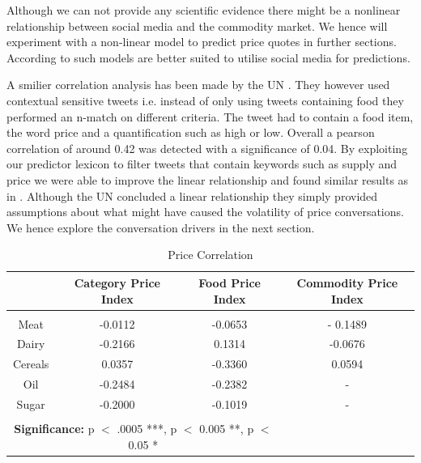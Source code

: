  Although we can not provide any scientific evidence there might be a nonlinear relationship between social media and the commodity market. We hence will experiment with a non-linear model to predict price quotes in further sections. According to \cite{de08} such models are better suited to utilise social media for predictions. 

A smilier correlation analysis has been made by the UN \cite{ungp2013}. They however used contextual sensitive tweets i.e. instead of only using tweets containing food they performed an n-match on different criteria. The tweet had to contain a food item, the word price and a quantification such as high or low. Overall a pearson correlation of around 0.42 was detected with a significance of 0.04. By exploiting our predictor lexicon to filter tweets that contain keywords such as supply and price we were able to improve the linear relationship and found similar results as in \cite{ungp2013}. Although the UN concluded a linear relationship they simply provided assumptions about what might have caused the volatility of price conversations. We hence explore the conversation drivers in the next section. 
 

 
\begin{table}[h]   
 \begin{tabular}{  c  | c  | c | c }
			
   & \textbf{Category Price Index}  & \textbf{Food Price Index} & \textbf{Commodity Price Index} \\
  \hline 
  &&& \\
  Meat & -0.0112   & -0.0653 & - 0.1489  \\
  
  Dairy & -0.2166   & 0.1314 & -0.0676\\

  Cereals & 0.0357  & -0.3360 & 0.0594 \\

  Oil & -0.2484  &  -0.2382 & -   \\

  Sugar & -0.2000 & -0.1019 &  - \\

\hline 

\multicolumn{3}{c}{\null}\\

\multicolumn{3}{c}{\textbf{Significance:} p $<$ .0005 ***, p $<$ 0.005 **, p $<$ 0.05 *}\\
\hline  

\end{tabular}
\caption{Price Correlation}
\label{tab:abc}


\end{table}


